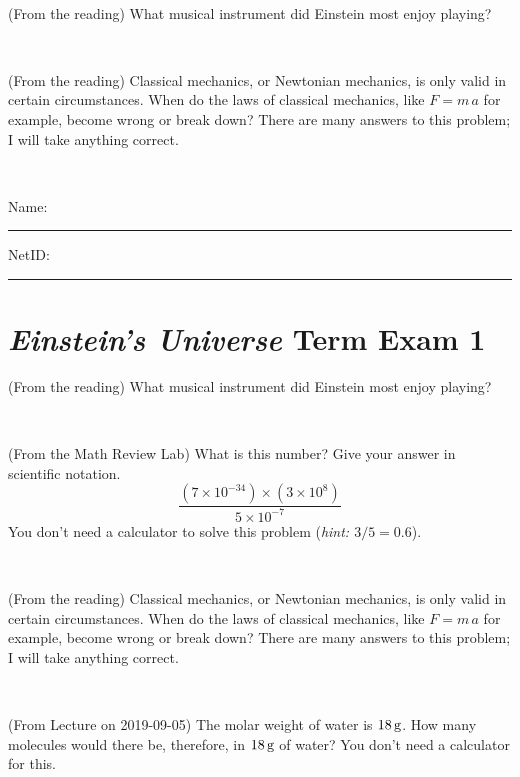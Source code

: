 \documentclass[12pt, letterpaper]{article}
\begin{document}
\vfill ~

\begin{problem} (From the reading)
What musical instrument did Einstein most enjoy playing?
\end{problem}


\vfill ~

\begin{problem} (From the reading)
Classical mechanics, or Newtonian mechanics, is only valid in certain
circumstances. When do the laws of classical mechanics, like $F =
m\,a$ for example, become wrong or break down? There are many answers
to this problem; I will take anything correct.
\end{problem}


\vfill ~


\cleardoublepage



\noindent
Name: \rule[-1ex]{0.60\textwidth}{0.1pt}
NetID: \rule[-1ex]{0.20\textwidth}{0.1pt}

\section*{\textsl{Einstein's Universe} Term Exam 1}
\setcounter{problem}{1}


\begin{problem} (From the reading)
What musical instrument did Einstein most enjoy playing?
\end{problem}


\vfill ~

\begin{problem} (From the Math Review Lab)
What is this number? Give your answer in scientific notation.
$$
\frac{(7\times10^{-34})\times(3\times10^8)}{5\times10^{-7}}
$$
You don't need a calculator to solve this problem (\textit{hint: $3/5=0.6$}).
\end{problem}


\vfill ~

\begin{problem} (From the reading)
Classical mechanics, or Newtonian mechanics, is only valid in certain
circumstances. When do the laws of classical mechanics, like $F =
m\,a$ for example, become wrong or break down? There are many answers
to this problem; I will take anything correct.
\end{problem}


\vfill ~

\begin{problem} (From Lecture on 2019-09-05)
The molar weight of water is $18\,\mathrm{g}$. How many molecules would there
be, therefore, in $18\,\mathrm{g}$ of water? You don't need a calculator for
this.
\end{problem}
\end{document}
